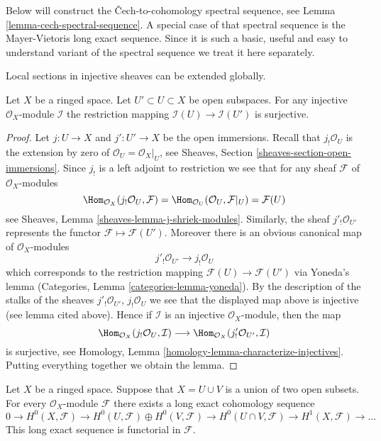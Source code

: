 \noindent
Below will construct the {\v C}ech-to-cohomology spectral sequence, see
Lemma \ref{lemma-cech-spectral-sequence}.
A special case of that spectral sequence is the Mayer-Vietoris
long exact sequence. Since it is such a basic, useful and easy to understand
variant of the spectral sequence we treat it here separately.

\begin{lemma}
\label{lemma-injective-restriction-surjective}
\begin{slogan}
Local sections in injective sheaves can be extended globally.
\end{slogan}
Let $X$ be a ringed space.
Let $U' \subset U \subset X$ be open subspaces.
For any injective $\mathcal{O}_X$-module $\mathcal{I}$ the
restriction mapping
$\mathcal{I}(U) \to \mathcal{I}(U')$ is surjective.
\end{lemma}

\begin{proof}
Let $j : U \to X$ and $j' : U' \to X$ be the open immersions.
Recall that $j_!\mathcal{O}_U$ is the extension by zero of
$\mathcal{O}_U = \mathcal{O}_X|_U$, see
Sheaves, Section \ref{sheaves-section-open-immersions}.
Since $j_!$ is a left adjoint to restriction we see that
for any sheaf $\mathcal{F}$ of $\mathcal{O}_X$-modules
$$
\Hom_{\mathcal{O}_X}(j_!\mathcal{O}_U, \mathcal{F})
=
\Hom_{\mathcal{O}_U}(\mathcal{O}_U, \mathcal{F}|_U)
=
\mathcal{F}(U)
$$
see Sheaves, Lemma \ref{sheaves-lemma-j-shriek-modules}.
Similarly, the sheaf $j'_!\mathcal{O}_{U'}$ represents the
functor $\mathcal{F} \mapsto \mathcal{F}(U')$.
Moreover there
is an obvious canonical map of $\mathcal{O}_X$-modules
$$
j'_!\mathcal{O}_{U'} \longrightarrow j_!\mathcal{O}_U
$$
which corresponds to the restriction mapping
$\mathcal{F}(U) \to \mathcal{F}(U')$ via Yoneda's lemma
(Categories, Lemma \ref{categories-lemma-yoneda}). By the description
of the stalks of the sheaves
$j'_!\mathcal{O}_{U'}$, $j_!\mathcal{O}_U$
we see that the displayed map above is injective (see lemma cited above).
Hence if $\mathcal{I}$ is an injective $\mathcal{O}_X$-module,
then the map
$$
\Hom_{\mathcal{O}_X}(j_!\mathcal{O}_U, \mathcal{I})
\longrightarrow
\Hom_{\mathcal{O}_X}(j'_!\mathcal{O}_{U'}, \mathcal{I})
$$
is surjective, see
Homology, Lemma \ref{homology-lemma-characterize-injectives}.
Putting everything together we obtain the lemma.
\end{proof}

\begin{lemma}
\label{lemma-mayer-vietoris}
Let $X$ be a ringed space. Suppose that $X = U \cup V$ is a
union of two open subsets. For every $\mathcal{O}_X$-module $\mathcal{F}$
there exists a long exact cohomology sequence
$$
0 \to
H^0(X, \mathcal{F}) \to
H^0(U, \mathcal{F}) \oplus H^0(V, \mathcal{F}) \to
H^0(U \cap V, \mathcal{F}) \to
H^1(X, \mathcal{F}) \to \ldots
$$
This long exact sequence is functorial in $\mathcal{F}$.
\end{lemma}

